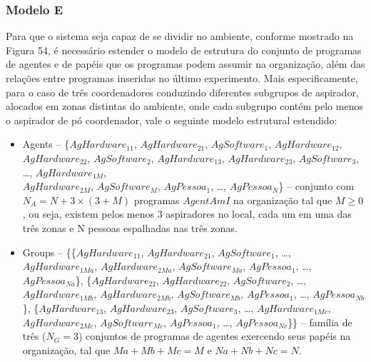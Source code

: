 \subsubsection{Modelo E}

Para que o sistema seja capaz de se dividir no ambiente, conforme mostrado na Figura 54, é necessário estender o modelo de estrutura do conjunto de programas de agentes e de papéis que os programas podem assumir na organização, além das relações entre programas inseridas no último experimento. Mais especificamente, para o caso de três coordenadores conduzindo diferentes subgrupos de aspirador, alocados em zonas distintas do ambiente, onde cada subgrupo contém pelo menos o aspirador de pó coordenador, vale o seguinte modelo estrutural estendido:

\begin{itemize}
    \item Agents -- \{$AgHardware_{11}$, $AgHardware_{21}$, $AgSoftware_1$, $AgHardware_{12}$, $AgHardware_{22}$, $AgSoftware_2$, $AgHardware_{13}$, $AgHardware_{23}$, $AgSoftware_3$, \ldots, $AgHardware_{1M}$, \\$AgHardware_{2M}$, $AgSoftware_M$, $AgPessoa_1$, \ldots, $AgPessoa_N$\} – conjunto com $N_A = N + 3 \times (3 + M)$ programas $AgentAmI$ na organização tal que $M \geq 0$, ou seja, existem pelos menos 3 aspiradores no local, cada um em uma das três zonas e N pessoas espalhadas nas três zonas.

    \item Groups -- \{\{$AgHardware_{11}$, $AgHardware_{21}$, $AgSoftware_1$, \ldots, $AgHardware_{1Ma}$, 
    $AgHardware_{2Ma}$, $AgSoftware_{Ma}$, $AgPessoa_1$, \ldots, $AgPessoa_{Na}$\}, \{$AgHardware_{22}$, 
    $AgHardware_{22}$, $AgSoftware_2$, \ldots, $AgHardware_{1Mb}$, $AgHardware_{2Mb}$, $AgSoftware_{Mb}$, 
    $AgPessoa_1$, \ldots, $AgPessoa_{Nb}$\}, \{$AgHardware_{13}$, $AgHardware_{23}$, $AgSoftware_3$, \ldots, $AgHardware_{1Mc}$, $AgHardware_{2Mc}$, $AgSoftware_{Mc}$, $AgPessoa_1$, \ldots, $AgPessoa_{Nc}$\}\} – família de três ($N_G = 3$) conjuntos de programas de agentes exercendo seus papéis na organização, tal que $Ma + Mb +Mc = M$ e $Na + Nb +Nc = N$.
    

\end{itemize}
